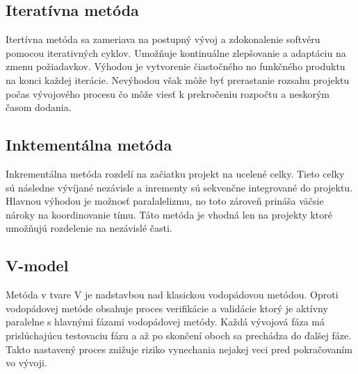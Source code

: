 
\subsection{Iteratívna metóda}
Itertívna metóda sa zameriava na postupný vývoj a zdokonalenie softvéru pomocou iterativných cyklov. Umožňuje kontinuálne zlepšovanie a adaptáciu na zmenu požiadavkov. Výhodou je vytvorenie čiastočného no funkčného produktu na konci každej iterácie. Nevýhodou však môže byť prerastanie rozsahu projektu počas vývojového procesu čo môže viesť k prekročeniu rozpočtu a neskorým časom dodania.

\subsection{Inktementálna metóda}
Inkrementálna metóda rozdelí na začiatku projekt na ucelené celky. Tieto celky sú následne vývíjané nezávisle a inrementy sú sekvenčne integrované do projektu. Hlavnou výhodou je možnosť paralalelizmu, no toto zároveň prináša väčsie nároky na koordinovanie tímu. Táto metóda je vhodná len na projekty ktoré umožňujú rozdelenie na nezávislé časti.


\subsection{V-model}
Metóda v tvare V je nadstavbou nad klasickou vodopádovou metódou. Oproti vodopádovej metóde obsahuje proces verifikácie a validácie ktorý je aktívny paralelne s hlavnými fázami vodopádovej metódy. Každá vývojová fáza má prislúchajúcu testovaciu fázu a až po skončení oboch sa prechádza do ďalšej fáze. Takto nastavený proces znižuje riziko vynechania nejakej veci pred pokračovaním vo vývoji.

